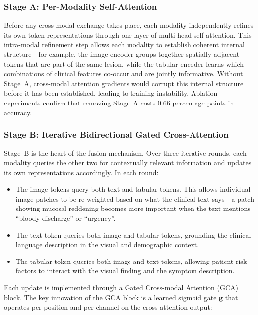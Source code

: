 \documentclass[conference]{IEEEtran}
\begin{document}
\subsubsection{Stage A: Per-Modality Self-Attention}

Before any cross-modal exchange takes place, each modality independently
refines its own token representations through one layer of multi-head
self-attention. This intra-modal refinement step allows each modality to
establish coherent internal structure---for example, the image encoder
groups together spatially adjacent tokens that are part of the same lesion,
while the tabular encoder learns which combinations of clinical features
co-occur and are jointly informative. Without Stage~A, cross-modal attention
gradients would corrupt this internal structure before it has been established,
leading to training instability. Ablation experiments confirm that removing
Stage~A costs 0.66 percentage points in accuracy.

\subsubsection{Stage B: Iterative Bidirectional Gated Cross-Attention}

Stage~B is the heart of the fusion mechanism. Over three iterative rounds,
each modality queries the other two for contextually relevant information
and updates its own representations accordingly. In each round:

\begin{itemize}
  \item The image tokens query both text and tabular tokens. This allows
        individual image patches to be re-weighted based on what the clinical
        text says---a patch showing mucosal reddening becomes more important
        when the text mentions ``bloody discharge'' or ``urgency''.
  \item The text token queries both image and tabular tokens, grounding the
        clinical language description in the visual and demographic context.
  \item The tabular token queries both image and text tokens, allowing
        patient risk factors to interact with the visual finding and the
        symptom description.
\end{itemize}

Each update is implemented through a Gated Cross-modal Attention (GCA) block.
The key innovation of the GCA block is a learned sigmoid gate $\mathbf{g}$
that operates per-position and per-channel on the cross-attention output:
\end{document}
